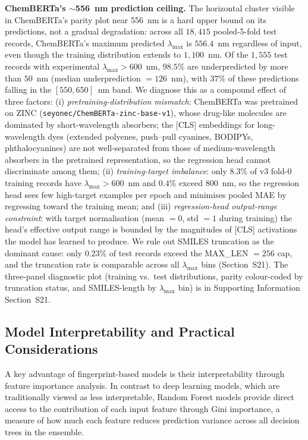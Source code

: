 \documentclass[journal=jcisd8,manuscript=article]{achemso}
\begin{document}
\textbf{ChemBERTa's $\sim$556~nm prediction ceiling.} The horizontal cluster visible in ChemBERTa's parity plot near 556~nm is a hard upper bound on its predictions, not a gradual degradation: across all $18{,}415$ pooled-5-fold test records, ChemBERTa's maximum predicted $\lambda_{\max}$ is $556.4$~nm regardless of input, even though the training distribution extends to $1{,}100$~nm. Of the $1{,}555$ test records with experimental $\lambda_{\max} > 600$~nm, $98.5$\% are underpredicted by more than $50$~nm (median underprediction $= 126$~nm), with $37$\% of these predictions falling in the $[550, 650]$~nm band. We diagnose this as a compound effect of three factors: (i) \emph{pretraining-distribution mismatch}: ChemBERTa was pretrained on ZINC (\texttt{seyonec/ChemBERTa-zinc-base-v1}), whose drug-like molecules are dominated by short-wavelength absorbers; the [CLS] embeddings for long-wavelength dyes (extended polyenes, push--pull cyanines, BODIPYs, phthalocyanines) are not well-separated from those of medium-wavelength absorbers in the pretrained representation, so the regression head cannot discriminate among them; (ii) \emph{training-target imbalance}: only $8.3$\% of v3 fold-0 training records have $\lambda_{\max} > 600$~nm and $0.4$\% exceed $800$~nm, so the regression head sees few high-target examples per epoch and minimises pooled MAE by regressing toward the training mean; and (iii) \emph{regression-head output-range constraint}: with target normalisation (mean $= 0$, std $= 1$ during training) the head's effective output range is bounded by the magnitudes of [CLS] activations the model has learned to produce. We rule out SMILES truncation as the dominant cause: only $0.23$\% of test records exceed the MAX\_LEN $= 256$ cap, and the truncation rate is comparable across all $\lambda_{\max}$ bins (Section~S21). The three-panel diagnostic plot (training vs.\ test distributions, parity colour-coded by truncation status, and SMILES-length by $\lambda_{\max}$ bin) is in Supporting Information Section~S21.


\subsection{Model Interpretability and Practical Considerations}
\label{sec:interpretability}

A key advantage of fingerprint-based models is their interpretability through feature importance analysis.
In contrast to deep learning models, which are traditionally viewed as less interpretable, Random Forest models provide direct access to the contribution of each input feature through Gini importance, a measure of how much each feature reduces prediction variance across all decision trees in the ensemble.
\end{document}

